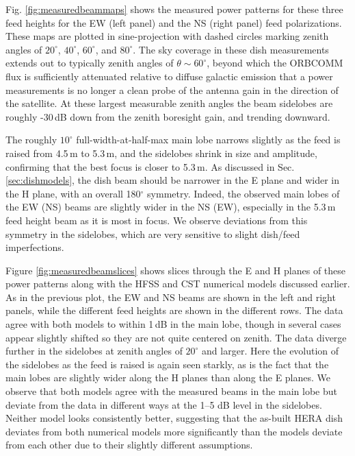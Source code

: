 \documentclass{emulateapj}
\begin{document}
Fig. \ref{fig:measuredbeammaps} shows the measured power patterns for these three feed heights for the EW (left panel) and the NS (right panel) feed polarizations. These maps are plotted in sine-projection with dashed circles marking zenith angles of $20^\circ$, $40^\circ$, $60^\circ$, and $80^\circ$. The sky coverage in these dish measurements extends out to typically zenith angles of $\theta\sim60^\circ$, beyond which the ORBCOMM flux is sufficiently attenuated relative to diffuse galactic emission that a power measurements is no longer a clean probe of the antenna gain in the direction of the satellite. At these largest measurable zenith angles the beam sidelobes are roughly -30\,dB down from the zenith boresight gain, and trending downward. 

The roughly $10^\circ$ full-width-at-half-max main lobe narrows slightly as the feed is raised from 4.5\,m to 5.3\,m, and the sidelobes shrink in size and amplitude, confirming that the best focus is closer to 5.3\,m. As discussed in Sec. \ref{sec:dishmodels}, the dish beam should be narrower in the E plane and wider in the H plane, with an overall 180$^\circ$ symmetry. Indeed, the observed main lobes of the EW (NS) beams are slightly wider in the NS (EW), especially in the 5.3\,m feed height beam as it is most in focus. We observe deviations from this symmetry in the sidelobes, which are very sensitive to slight dish/feed imperfections. 

Figure \ref{fig:measuredbeamslices} shows slices through the E and H planes of these power patterns along with the HFSS and CST numerical models discussed earlier. As in the previous plot, the EW and NS beams are shown in the left and right panels, while the different feed heights are shown in the different rows. The data agree with both models to within 1\,dB in the main lobe, though in several cases appear slightly shifted so they are not quite centered on zenith. The data diverge further in the sidelobes at zenith angles of $20^\circ$ and larger. Here the evolution of the sidelobes as the feed is raised is again seen starkly, as is the fact that the main lobes are slightly wider along the H planes than along the E planes. We observe that both models agree with the measured beams in the main lobe but deviate from the data in different ways at the 1--5 dB level in the sidelobes. Neither model looks consistently better, suggesting that the as-built HERA dish deviates from both numerical models more significantly than the models deviate from each other due to their slightly different assumptions. 
\end{document}
